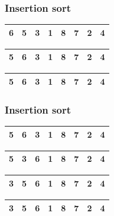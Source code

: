 \begin{frame}
\frametitle{Insertion sort}
\begin{table}
\begin{tabular}{| c | c | c | c | c | c | c | c |}
\hline
\cellcolor{blue!25}6 & \cellcolor{red!25}5 & 3 & 1 & 8 & 7 & 2 & 4 \\ 
\hline
\end{tabular}
\end{table}
\begin{table}
\begin{tabular}{| c | c | c | c | c | c | c | c |}
\hline
\cellcolor{red!25}5 & \cellcolor{blue!25}6 & 3 & 1 & 8 & 7 & 2 & 4 \\ 
\hline
\end{tabular}
\end{table}
\begin{table}
\begin{tabular}{| c | c | c | c | c | c | c | c |}
\hline
\cellcolor{blue!25}5 & \cellcolor{blue!25}6 & 3 & 1 & 8 & 7 & 2 & 4 \\ 
\hline
\end{tabular}
\end{table}
\end{frame}

\begin{frame}
\frametitle{Insertion sort}
\begin{table}
\begin{tabular}{| c | c | c | c | c | c | c | c |}
\hline
\cellcolor{blue!25}5 & \cellcolor{blue!25}6 & \cellcolor{red!25}3 & 1 & 8 & 7 & 2 & 4 \\ 
\hline
\end{tabular}
\end{table}
\begin{table}
\begin{tabular}{| c | c | c | c | c | c | c | c |}
\hline
\cellcolor{blue!25}5 & \cellcolor{red!25}3 & \cellcolor{blue!25}6 & 1 & 8 & 7 & 2 & 4 \\ 
\hline
\end{tabular}
\end{table}
\begin{table}
\begin{tabular}{| c | c | c | c | c | c | c | c |}
\hline
\cellcolor{red!25}3 & \cellcolor{blue!25}5 & \cellcolor{blue!25}6 & 1 & 8 & 7 & 2 & 4 \\ 
\hline
\end{tabular}
\end{table}
\begin{table}
\begin{tabular}{| c | c | c | c | c | c | c | c |}
\hline
\cellcolor{blue!25}3 & \cellcolor{blue!25}5 & \cellcolor{blue!25}6 & 1 & 8 & 7 & 2 & 4 \\ 
\hline
\end{tabular}
\end{table}
\end{frame}

